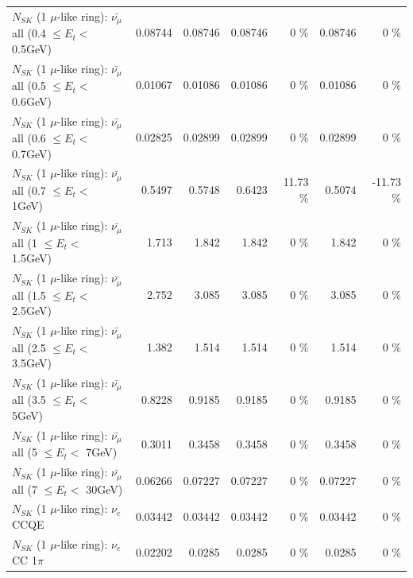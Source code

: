 \begin{table}
\begin{tabular}{| l | r | r | r  r | r  r |}
 $N_{SK}$ (1 $\mu$-like ring): $\bar{\nu_{\mu}}$ all (0.4 $\leq E_{t} <$ 0.5GeV) &         0.08744 &         0.08746 &         0.08746 &        0 \%  &         0.08746 &        0 \%  \\ 
 $N_{SK}$ (1 $\mu$-like ring): $\bar{\nu_{\mu}}$ all (0.5 $\leq E_{t} <$ 0.6GeV) &         0.01067 &         0.01086 &         0.01086 &        0 \%  &         0.01086 &        0 \%  \\ 
 $N_{SK}$ (1 $\mu$-like ring): $\bar{\nu_{\mu}}$ all (0.6 $\leq E_{t} <$ 0.7GeV) &         0.02825 &         0.02899 &         0.02899 &        0 \%  &         0.02899 &        0 \%  \\ 
   $N_{SK}$ (1 $\mu$-like ring): $\bar{\nu_{\mu}}$ all (0.7 $\leq E_{t} <$ 1GeV) &          0.5497 &          0.5748 &          0.6423 &    11.73 \%  &          0.5074 &   -11.73 \%  \\ 
   $N_{SK}$ (1 $\mu$-like ring): $\bar{\nu_{\mu}}$ all (1 $\leq E_{t} <$ 1.5GeV) &           1.713 &           1.842 &           1.842 &        0 \%  &           1.842 &        0 \%  \\ 
 $N_{SK}$ (1 $\mu$-like ring): $\bar{\nu_{\mu}}$ all (1.5 $\leq E_{t} <$ 2.5GeV) &           2.752 &           3.085 &           3.085 &        0 \%  &           3.085 &        0 \%  \\ 
 $N_{SK}$ (1 $\mu$-like ring): $\bar{\nu_{\mu}}$ all (2.5 $\leq E_{t} <$ 3.5GeV) &           1.382 &           1.514 &           1.514 &        0 \%  &           1.514 &        0 \%  \\ 
   $N_{SK}$ (1 $\mu$-like ring): $\bar{\nu_{\mu}}$ all (3.5 $\leq E_{t} <$ 5GeV) &          0.8228 &          0.9185 &          0.9185 &        0 \%  &          0.9185 &        0 \%  \\ 
     $N_{SK}$ (1 $\mu$-like ring): $\bar{\nu_{\mu}}$ all (5 $\leq E_{t} <$ 7GeV) &          0.3011 &          0.3458 &          0.3458 &        0 \%  &          0.3458 &        0 \%  \\ 
    $N_{SK}$ (1 $\mu$-like ring): $\bar{\nu_{\mu}}$ all (7 $\leq E_{t} <$ 30GeV) &         0.06266 &         0.07227 &         0.07227 &        0 \%  &         0.07227 &        0 \%  \\ 
\hline
\hline
\hline
                                      $N_{SK}$ (1 $\mu$-like ring): $\nu_e$ CCQE &         0.03442 &         0.03442 &         0.03442 &        0 \%  &         0.03442 &        0 \%  \\ 
                                 $N_{SK}$ (1 $\mu$-like ring): $\nu_e$ CC 1$\pi$ &         0.02202 &          0.0285 &          0.0285 &        0 \%  &          0.0285 &        0 \%  \\ 

\end{tabular}
\end{table}
